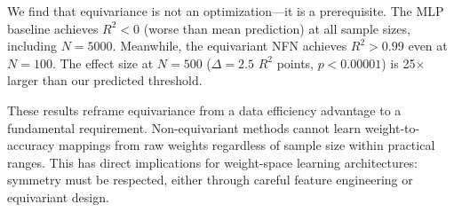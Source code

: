 We find that equivariance is not an optimization---it is a prerequisite. The MLP baseline achieves $R^2 < 0$ (worse than mean prediction) at all sample sizes, including $N=5000$. Meanwhile, the equivariant NFN achieves $R^2 > 0.99$ even at $N=100$. The effect size at $N=500$ ($\Delta = 2.5$ $R^2$ points, $p < 0.00001$) is 25$\times$ larger than our predicted threshold.

These results reframe equivariance from a data efficiency advantage to a fundamental requirement. Non-equivariant methods cannot learn weight-to-accuracy mappings from raw weights regardless of sample size within practical ranges. This has direct implications for weight-space learning architectures: symmetry must be respected, either through careful feature engineering or equivariant design.
